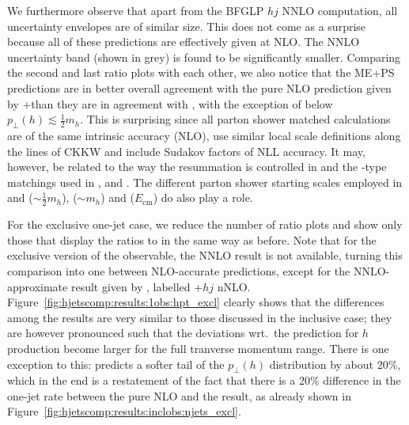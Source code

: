 We furthermore observe that apart from the BFGLP $hj$ NNLO computation,
all uncertainty envelopes are of similar size. This does not come as
a surprise because all of these predictions are effectively given at
NLO. The NNLO uncertainty band (shown in grey) is found to be
significantly smaller. Comparing the second and last ratio plots with
each other, we also notice that the ME+PS predictions are in better
overall agreement with the pure NLO prediction given by
\GoSam{}+\Sherpa than they are in agreement with \Powheg, with the
exception of \MGaMC below $p_\perp(h)\lesssim\tfrac{1}{2}m_h$. This is
surprising since all parton shower matched calculations are of the
same intrinsic accuracy (NLO), use similar local scale definitions
along the lines of CKKW and include Sudakov factors of NLL accuracy.
It may, however, be related to the way the resummation is controlled
in \Powheg and the \MCatNLO-type matchings used in \MGaMC, \Herwig and
\Sherpa. The different parton shower starting scales employed in
\Herwig and \Sherpa ($\sim\tfrac{1}{2}m_h$), \MGaMC ($\sim m_h$) and
\Powheg ($E_\mathrm{cm}$) do also play a role.

For the exclusive one-jet case, we reduce the number of ratio plots
and show only those that display the ratios to \Powheg in the same way
as before. Note that for the exclusive version of the observable, the
NNLO result is not available, turning this comparison into one between
NLO-accurate predictions, except for the NNLO-approximate result given
by \Loopsim, labelled \GoSam{}+\Sherpa $hj$ nNLO.
Figure~\ref{fig:hjetscomp:results:1obs:hpt_excl} clearly shows that
the differences among the results are very similar to those discussed
in the inclusive case; they are however pronounced such that the
deviations wrt.~the \Powheg \NNLOPS prediction for $h$ production
become larger for the full tranverse momentum range. There is one
exception to this: \Loopsim predicts a softer tail of the $p_\perp(h)$
distribution by about 20\%, which in the end is a restatement of the
fact that there is a 20\% difference in the one-jet rate between the
pure NLO and the \Loopsim result, as already shown in
Figure~\ref{fig:hjetscomp:results:inclobs:njets_excl}.

